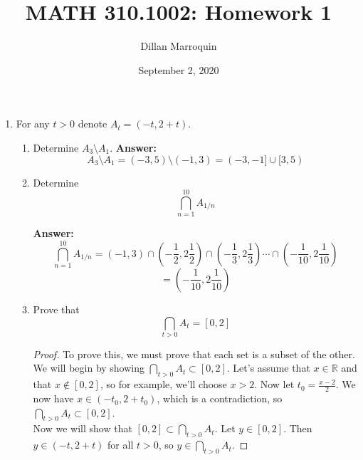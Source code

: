 \documentclass{article}
\title{MATH 310.1002: Homework 1}
\author{Dillan Marroquin}
\date{September 2, 2020}
\begin{document}
\maketitle


    \begin{enumerate}
        \item For any $t > 0$ denote $A_t = (-t, 2 + t)$.
        
            \begin{enumerate}
                \item Determine $A_3 \setminus A_1$.
                \newline \textbf{Answer:}
                    \[A_3\setminus A_1 = (-3, 5) \setminus (-1, 3) = (-3, -1] \cup [3, 5)\]
                
                \item Determine 
                    \[\bigcap_{n=1}^{10} A_{1/n}\]
                    
                \textbf{Answer:}
                    \[\bigcap_{n=1}^{10} A_{1/n} = (-1,3) \cap (-\textstyle\frac{1}{2}, 2\frac{1}{2}) \cap (-\textstyle\frac{1}{3}, 2\frac{1}{3}) \cdots \cap (-\textstyle\frac{1}{10}, 2\frac{1}{10})\] \[= (-\textstyle\frac{1}{10}, 2\frac{1}{10})\]
                    
                \item Prove that
                 \[\bigcap_{t>0} A_t = [0,2]\]
                    \begin{proof}
                        To prove this, we must prove that each set is a subset of the other.\\
                        
                        We will begin by showing $\bigcap_{t>0} A_t \subset [0, 2]$. Let's assume that $x \in \mathbb{R}$ and that $x \notin [0, 2]$, so for example, we'll choose $x > 2$. Now let $t_0 = \frac{x-2}{2}$. We now have $x \in (-t_0, 2+t_0)$, which is a contradiction, so $\bigcap_{t>0} A_t \subset [0, 2]$. \\
                        
                        Now we will show that $[0, 2] \subset \bigcap_{t>0} A_t$. Let $y \in [0,2]$. Then $y \in (-t, 2+t)$ for all $t > 0$, so $y \in \bigcap_{t>0} A_t$.
                        
                    \end{proof}
        
            \end{enumerate}


\end{enumerate}
\end{document}
